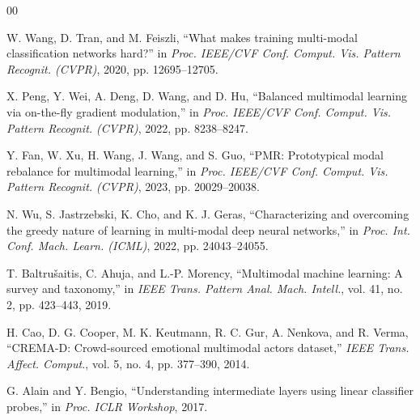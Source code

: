 \documentclass[conference]{IEEEtran}
\begin{document}
\begin{thebibliography}{00}

W. Wang, D. Tran, and M. Feiszli, ``What makes training multi-modal classification networks hard?'' in \emph{Proc. IEEE/CVF Conf. Comput. Vis. Pattern Recognit. (CVPR)}, 2020, pp. 12695--12705.

X. Peng, Y. Wei, A. Deng, D. Wang, and D. Hu, ``Balanced multimodal learning via on-the-fly gradient modulation,'' in \emph{Proc. IEEE/CVF Conf. Comput. Vis. Pattern Recognit. (CVPR)}, 2022, pp. 8238--8247.

Y. Fan, W. Xu, H. Wang, J. Wang, and S. Guo, ``PMR: Prototypical modal rebalance for multimodal learning,'' in \emph{Proc. IEEE/CVF Conf. Comput. Vis. Pattern Recognit. (CVPR)}, 2023, pp. 20029--20038.

N. Wu, S. Jastrzebski, K. Cho, and K. J. Geras, ``Characterizing and overcoming the greedy nature of learning in multi-modal deep neural networks,'' in \emph{Proc. Int. Conf. Mach. Learn. (ICML)}, 2022, pp. 24043--24055.

T. Baltru\v{s}aitis, C. Ahuja, and L.-P. Morency, ``Multimodal machine learning: A survey and taxonomy,'' in \emph{IEEE Trans. Pattern Anal. Mach. Intell.}, vol. 41, no. 2, pp. 423--443, 2019.

H. Cao, D. G. Cooper, M. K. Keutmann, R. C. Gur, A. Nenkova, and R. Verma, ``CREMA-D: Crowd-sourced emotional multimodal actors dataset,'' \emph{IEEE Trans. Affect. Comput.}, vol. 5, no. 4, pp. 377--390, 2014.

G. Alain and Y. Bengio, ``Understanding intermediate layers using linear classifier probes,'' in \emph{Proc. ICLR Workshop}, 2017.


\end{thebibliography}
\end{document}
